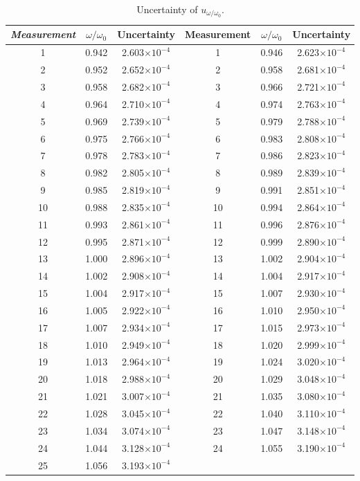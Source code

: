 \documentclass{article}
\begin{document}
\begin{table}[!h]
\begin{center}
\begin{tabular}{|c|c|c|c|c|c|}
\hline
\textit{Measurement} & $\omega/\omega_0$ & Uncertainty & 
Measurement & $\omega/\omega_0$ & Uncertainty 
\\
\hline
1	&	0.942	&	2.603$\times10^{-4}$	&	1	&	0.946	&	2.623$\times10^{-4}$\\
2	&	0.952	&	2.652$\times10^{-4}$	&	2	&	0.958	&	2.681$\times10^{-4}$\\
3	&	0.958	&	2.682$\times10^{-4}$	&	3	&	0.966	&	2.721$\times10^{-4}$\\
4	&	0.964	&	2.710$\times10^{-4}$	&	4	&	0.974	&	2.763$\times10^{-4}$\\
5	&	0.969	&	2.739$\times10^{-4}$	&	5	&	0.979	&	2.788$\times10^{-4}$\\
6	&	0.975	&	2.766$\times10^{-4}$	&	6	&	0.983	&	2.808$\times10^{-4}$\\
7	&	0.978	&	2.783$\times10^{-4}$	&	7	&	0.986	&	2.823$\times10^{-4}$\\
8	&	0.982	&	2.805$\times10^{-4}$	&	8	&	0.989	&	2.839$\times10^{-4}$\\
9	&	0.985	&	2.819$\times10^{-4}$	&	9	&	0.991	&	2.851$\times10^{-4}$\\
10	&	0.988	&	2.835$\times10^{-4}$	&	10	&	0.994	&	2.864$\times10^{-4}$\\
11	&	0.993	&	2.861$\times10^{-4}$	&	11	&	0.996	&	2.876$\times10^{-4}$\\
12	&	0.995	&	2.871$\times10^{-4}$	&	12	&	0.999	&	2.890$\times10^{-4}$\\
13	&	1.000	&	2.896$\times10^{-4}$	&	13	&	1.002	&	2.904$\times10^{-4}$\\
14	&	1.002	&	2.908$\times10^{-4}$	&	14	&	1.004	&	2.917$\times10^{-4}$\\
15	&	1.004	&	2.917$\times10^{-4}$	&	15	&	1.007	&	2.930$\times10^{-4}$\\
16	&	1.005	&	2.922$\times10^{-4}$	&	16	&	1.010	&	2.950$\times10^{-4}$\\
17	&	1.007	&	2.934$\times10^{-4}$	&	17	&	1.015	&	2.973$\times10^{-4}$\\
18	&	1.010	&	2.949$\times10^{-4}$	&	18	&	1.020	&	2.999$\times10^{-4}$\\
19	&	1.013	&	2.964$\times10^{-4}$	&	19	&	1.024	&	3.020$\times10^{-4}$\\
20	&	1.018	&	2.988$\times10^{-4}$	&	20	&	1.029	&	3.048$\times10^{-4}$\\
21	&	1.021	&	3.007$\times10^{-4}$	&	21	&	1.035	&	3.080$\times10^{-4}$\\
22	&	1.028	&	3.045$\times10^{-4}$	&	22	&	1.040	&	3.110$\times10^{-4}$\\
23	&	1.034	&	3.074$\times10^{-4}$	&	23	&	1.047	&	3.148$\times10^{-4}$\\
24	&	1.044	&	3.128$\times10^{-4}$	&	24	&	1.055	&	3.190$\times10^{-4}$\\
25	&	1.056	&	3.193$\times10^{-4}$	&		&			&\\
\hline
\end{tabular}
\caption{Uncertainty of $u_{\omega/\omega_0}$.}
\label{tab-6}
\end{center}
\end{table}
\end{document}
